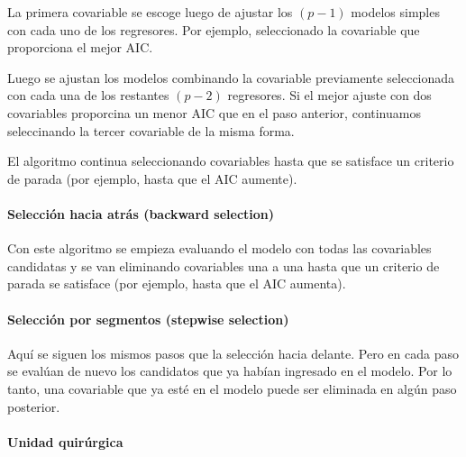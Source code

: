 \documentclass[
]{article}
\begin{document}
La primera covariable se escoge luego de ajustar los \((p-1)\) modelos simples con cada uno de los regresores. Por ejemplo, seleccionado la covariable que proporciona el mejor AIC.

Luego se ajustan los modelos combinando la covariable previamente seleccionada con cada una de los restantes \((p-2)\) regresores. Si el mejor ajuste con dos covariables proporcina un menor AIC que en el paso anterior, continuamos seleccinando la tercer covariable de la misma forma.

El algoritmo continua seleccionando covariables hasta que se satisface un criterio de parada (por ejemplo, hasta que el AIC aumente).

\hypertarget{selecciuxf3n-hacia-atruxe1s-backward-selection}{%
\paragraph{Selección hacia atrás (backward selection)}\label{selecciuxf3n-hacia-atruxe1s-backward-selection}}

Con este algoritmo se empieza evaluando el modelo con todas las covariables candidatas y se van eliminando covariables una a una hasta que un criterio de parada se satisface (por ejemplo, hasta que el AIC aumenta).

\hypertarget{selecciuxf3n-por-segmentos-stepwise-selection}{%
\paragraph{Selección por segmentos (stepwise selection)}\label{selecciuxf3n-por-segmentos-stepwise-selection}}

Aquí se siguen los mismos pasos que la selección hacia delante. Pero en cada paso se evalúan de nuevo los candidatos que ya habían ingresado en el modelo. Por lo tanto, una covariable que ya esté en el modelo puede ser eliminada en algún paso posterior.

\hypertarget{unidad-quiruxfargica-1}{%
\paragraph{Unidad quirúrgica}\label{unidad-quiruxfargica-1}}
\end{document}
